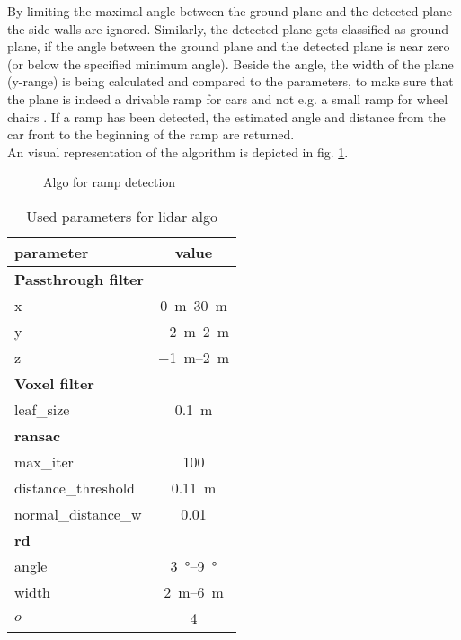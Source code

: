By limiting the maximal angle between the ground plane and the detected plane the side walls are ignored.
Similarly, the detected plane gets classified as ground plane, if the angle between the ground plane and the detected plane is near zero (or below the specified minimum angle).
Beside the angle, the width of the plane (y-range) is being calculated and compared to the parameters, to make sure that the plane is indeed a drivable ramp for cars and not e.g. a small ramp for wheel chairs .
If a ramp has been detected, the estimated angle and distance from the car front to the beginning of the ramp are returned.\\
An visual representation of the algorithm is depicted in fig. \ref{fig:flowchart_lidar}.
\begin{figure}[htb]
    \centering
    
    \caption{Algo for ramp detection}
    \label{fig:flowchart_lidar}
\end{figure}

\begin{table}[htb]
	\centering
	\caption{Used parameters for lidar algo}
	\label{tab:lidar_params}
	\begin{tabular}[t]{lc}
	\toprule
	\textbf{parameter}  &\textbf{value} \\
	\midrule
    \textbf{Passthrough filter}\\
	x 				    & \SIrange{0}{30}{\metre}\\
    y 				    & \SIrange{-2}{2}{\metre}\\
	z                   & \SIrange{-1}{2}{\metre}\\
	\midrule
    \textbf{Voxel filter}\\
    leaf\_size          & \SI{0.1}{\metre}\\
    \midrule
    \textbf{\acrshort{ransac}}\\
    max\_iter           & 100\\
    distance\_threshold & \SI{0.11}{\metre}\\
    normal\_distance\_w & 0.01\\
    \midrule
    \textbf{rd}\\
    angle               & \SIrange{3}{9}{\degree}\\
    width               & \SIrange{2}{6}{\metre}\\
    $o$                 & 4\\
	\bottomrule
	\end{tabular}
\end{table}%



